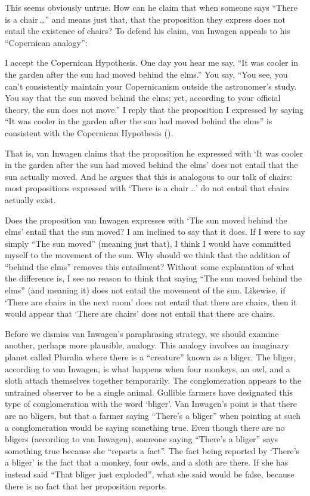 \documentclass[12pt,twoside]{reedfancy}
\newenvironment{squote}{%
	\begin{spacing}{1}
	\begin{list}{}{%
	\setlength{\labelwidth}{0pt}%
	\rightmargin\leftmargin%
	}
	\item\relax
	}{%
	\end{list}%
	\end{spacing}
	}
\begin{document}
\begin{spacing}{1.25}
This seems obviously untrue.  How can he claim that when someone says
``There is a chair\,\ldots '' and means just that, that the
proposition they express does not entail the existence of chairs?  To
defend his claim, van Inwagen appeals to his ``Copernican analogy'':

\begin{squote}
I accept the Copernican Hypothesis.  One day you hear me say, ``It was
cooler in the garden after the sun had moved behind the elms.''  You
say, ``You see, you can't consistently maintain your Copernicanism
outside the astronomer's study.  You say that the sun moved behind the
elms; yet, according to your official theory, the sun does not move.''
I reply that the proposition I expressed by saying ``It was cooler in
the garden after the sun had moved behind the elms'' is consistent
with the Copernican Hypothesis (\citeyear[101]{inwagen1995}).
\end{squote}
That is, van Inwagen claims that the proposition he expressed with `It
was cooler in the garden after the sun had moved behind the elms' does
not entail that the sun actually moved.  And he argues that this is
analogous to our talk of chairs: most propositions expressed with
`There is a chair\,\ldots ' do not entail that chairs actually exist.

Does the proposition van Inwagen expresses with `The sun moved behind
the elms' entail that the sun moved?  I am inclined to say that it
does.  If I were to say simply ``The sun moved'' (meaning just that),
I think I would have committed myself to the movement of the sun.  Why
should we think that the addition of ``behind the elms'' removes this
entailment?  Without some explanation of what the difference is, I see
no reason to think that saying ``The sun moved behind the elms'' (and
meaning it) does not entail the movement of the sun.  Likewise, if
`There are chairs in the next room' does not entail that there are
chairs, then it would appear that `There are chairs' does not entail
that there are chairs.

Before we dismiss van Inwagen's paraphrasing strategy, we should
examine another, perhaps more plausible, analogy.  This analogy
involves an imaginary planet called Pluralia where there is a
``creature'' known as a bliger.  The bliger, according to van Inwagen,
is what happens when four monkeys, an owl, and a sloth attach
themselves together temporarily.  The conglomeration appears to the
untrained observer to be a single animal.  Gullible farmers have
designated this type of conglomeration with the word `bliger'.  Van
Inwagen's point is that there are no bligers, but that a farmer saying
``There's a bliger'' when pointing at such a conglomeration would be
saying something true.  Even though there are no bligers (according to
van Inwagen), someone saying ``There's a bliger'' says something true
because she ``reports a fact''.  The fact being reported by `There's a
bliger' is the fact that a monkey, four owls, and a sloth are there.
If she has instead said ``That bliger just exploded'', what she said
would be false, because there is no fact that her proposition reports.


\end{spacing}
\end{document}
